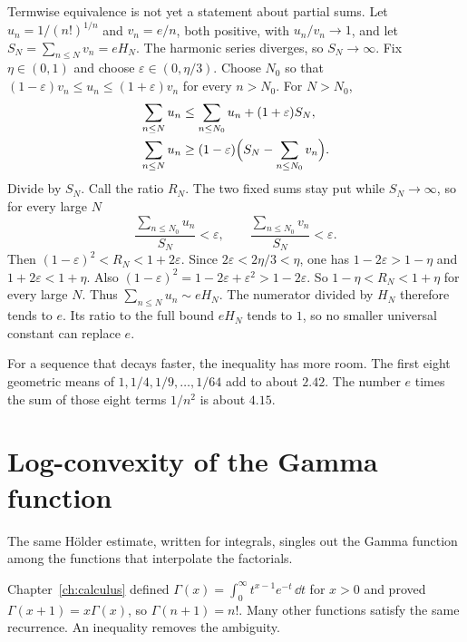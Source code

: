 Termwise equivalence is not yet a statement about partial sums. Let $u_n=1/(n!)^{1/n}$ and $v_n=e/n$, both positive, with $u_n/v_n\to1$, and let $S_N=\sum_{n\le N}v_n=eH_N$. The harmonic series diverges, so $S_N\to\infty$. Fix $\eta\in(0,1)$ and choose $\varepsilon\in(0,\eta/3)$. Choose $N_0$ so that $(1-\varepsilon)v_n\le u_n\le(1+\varepsilon)v_n$ for every $n>N_0$. For $N>N_0$,
\begin{align*}
\sum_{n\le N}u_n
&\le\sum_{n\le N_0}u_n+(1+\varepsilon)S_N,\\
\sum_{n\le N}u_n
&\ge(1-\varepsilon)\Bigl(S_N-\sum_{n\le N_0}v_n\Bigr).
\end{align*}
Divide by $S_N$. Call the ratio $R_N$. The two fixed sums stay put while $S_N\to\infty$, so for every large $N$
\[
\frac{\sum_{n\le N_0}u_n}{S_N}<\varepsilon,\qquad
\frac{\sum_{n\le N_0}v_n}{S_N}<\varepsilon.
\]
Then $(1-\varepsilon)^2<R_N<1+2\varepsilon$. Since $2\varepsilon<2\eta/3<\eta$, one has $1-2\varepsilon>1-\eta$ and $1+2\varepsilon<1+\eta$. Also $(1-\varepsilon)^2=1-2\varepsilon+\varepsilon^2>1-2\varepsilon$. So $1-\eta<R_N<1+\eta$ for every large $N$. Thus $\sum_{n\le N}u_n\sim eH_N$. The numerator divided by $H_N$ therefore tends to $e$. Its ratio to the full bound $eH_N$ tends to $1$, so no smaller universal constant can replace $e$.

For a sequence that decays faster, the inequality has more room. The first eight geometric means of $1,1/4,1/9,\dots,1/64$ add to about $2.42$. The number $e$ times the sum of those eight terms $1/n^2$ is about $4.15$.

\section{Log-convexity of the Gamma function}\label{sec:gamma-convexity}

The same H\"older estimate, written for integrals, singles out the Gamma function among the functions that interpolate the factorials.

Chapter~\ref{ch:calculus} defined $\Gamma(x)=\int_0^\infty t^{x-1}e^{-t}\,\dd t$ for $x>0$ and proved $\Gamma(x+1)=x\Gamma(x)$, so $\Gamma(n+1)=n!$. Many other functions satisfy the same recurrence. An inequality removes the ambiguity.

